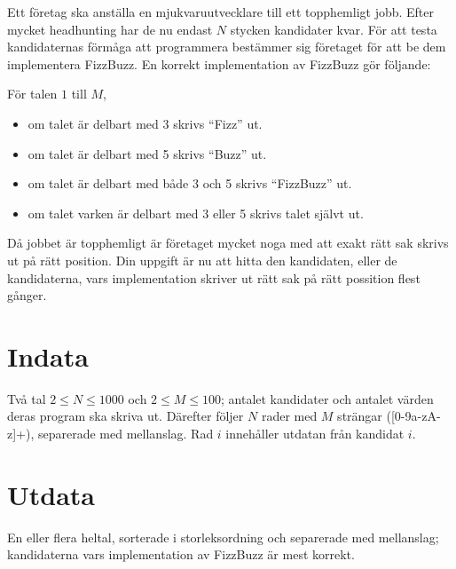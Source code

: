 Ett företag ska anställa en mjukvaruutvecklare till ett topphemligt jobb.
Efter mycket headhunting har de nu endast $N$ stycken kandidater kvar.
För att testa kandidaternas förmåga att programmera bestämmer sig företaget för att be dem implementera FizzBuzz. En korrekt implementation av FizzBuzz gör följande:

För talen $1$ till $M$,
\begin{itemize}
 \item om talet är delbart med 3 skrivs ``Fizz'' ut.
 \item om talet är delbart med 5 skrivs ``Buzz'' ut.
 \item om talet är delbart med både 3 och 5 skrivs ``FizzBuzz'' ut. 
 \item om talet varken är delbart med 3 eller 5 skrivs talet självt ut. 
\end{itemize}

Då jobbet är topphemligt är företaget mycket noga med att exakt rätt sak skrivs ut på rätt position.
Din uppgift är nu att hitta den kandidaten, eller de kandidaterna, vars implementation skriver ut rätt sak på rätt possition flest gånger. 

\section*{Indata}
Två tal $2 \leq N \leq 1000$ och $2 \leq M \leq 100$; antalet kandidater och antalet värden deras program ska skriva ut.
Därefter följer $N$ rader med $M$ strängar ([0-9a-zA-z]+), separerade med mellanslag. Rad $i$ innehåller utdatan från kandidat $i$.  

\section*{Utdata}
En eller flera heltal, sorterade i storleksordning och separerade med mellanslag; kandidaterna vars implementation av FizzBuzz är mest korrekt. 
